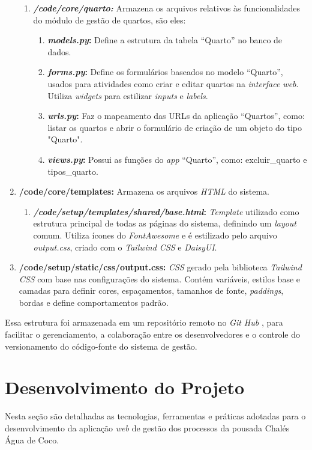 \documentclass[
	12pt,				%
	openany,			%
	twoside,			%
	a4paper,			%
	english,			%
	french,				%
	spanish,			%
	brazil				%
	]{abntex2}
\begin{document}
\begin{enumerate}
\begin{enumerate}
		\item \textbf{\textit{/code/core/quarto:}} Armazena os arquivos relativos às funcionalidades do módulo de gestão de quartos, são eles:
		\begin{enumerate}
			\item \textbf{\textit{models.py}:} Define a estrutura da tabela “Quarto” no banco de dados.
			\item \textbf{\textit{forms.py}:} Define os formulários baseados no modelo “Quarto”, usados para atividades como criar e editar quartos na \textit{interface web}. Utiliza \textit{widgets} para estilizar \textit{inputs} e \textit{labels}.
			\item \textbf{\textit{urls.py}:} Faz o mapeamento das URLs da aplicação “Quartos”, como: listar os quartos e abrir o formulário de criação de um objeto do tipo "Quarto".
			\item \textbf{\textit{views.py}:} Possui as funções do \textit{app} “Quarto”, como: excluir\_quarto e tipos\_quarto.
		\end{enumerate}
	\end{enumerate}
	
	\item \textbf{/code/core/templates:} Armazena os arquivos \textit{HTML} do sistema.
	\begin{enumerate}
		\item \textbf{\textit{/code/setup/templates/shared/base.html}:} \textit{Template} utilizado como estrutura principal de todas as páginas do sistema, definindo um \textit{layout} comum. Utiliza ícones do \textit{FontAwesome} e é estilizado pelo arquivo \textit{output.css}, criado com o \textit{Tailwind CSS} e \textit{DaisyUI}.
	\end{enumerate}
	
	\item \textbf{/code/setup/static/css/output.css:} \textit{CSS} gerado pela biblioteca \textit{Tailwind CSS} com base nas configurações do sistema. Contém variáveis, estilos base e camadas para definir cores, espaçamentos, tamanhos de fonte, \textit{paddings}, bordas e define comportamentos padrão.
\end{enumerate}

Essa estrutura foi armazenada em um repositório remoto no \textit{Git Hub} \cite{repositorio}, para facilitar o gerenciamento, a colaboração entre os desenvolvedores e o controle do versionamento do código-fonte do sistema de gestão. 
\chapter{Desenvolvimento do Projeto}Nesta seção são detalhadas as tecnologias, ferramentas e práticas adotadas para o desenvolvimento da aplicação \textit{web} de gestão dos processos da pousada Chalés Água de Coco.
\end{document}
